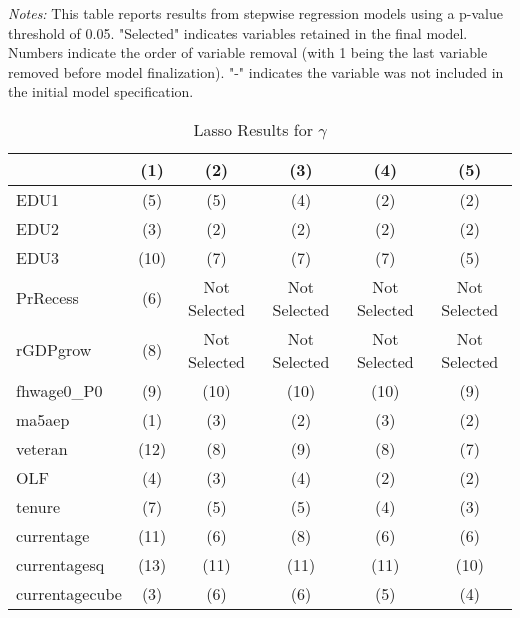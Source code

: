 \documentclass[12pt]{article}
\begin{document}
\begin{table}[ht]
\begin{tabular}{lccccc}
\bottomrule
\end{tabular}%
\newline

\footnotesize
\textit{Notes:} This table reports results from stepwise regression models using a p-value threshold of 0.05. "Selected" indicates variables retained in the final model. Numbers indicate the order of variable removal (with 1 being the last variable removed before model finalization). "-" indicates the variable was not included in the initial model specification.

\end{table}





\begin{table}[ht]
\centering
\caption{Lasso Results for $\gamma$}

\begin{tabular}{lccccc}

\toprule
                    & (1)     & (2)   & (3)    & (4)      & (5)         \\

\midrule
EDU1                &  (5)  &  (5)    &  (4)  &  (2)   &  (2)    \\
EDU2                &  (3)  &  (2)    &  (2)  &  (2)   &  (2)    \\
EDU3                &  (10)  &  (7)    &  (7)  &  (7)   &  (5)    \\
PrRecess            &  (6)   & Not Selected    & Not Selected   & Not Selected    & Not Selected     \\
rGDPgrow            &  (8)   & Not Selected     & Not Selected   & Not Selected    & Not Selected     \\
fhwage0\_P0         &  (9)   &  (10)     &  (10)   &  (10)    &  (9)     \\
ma5aep              &  (1)   &  (3)     &  (2)   &  (3)    &  (2)     \\
veteran             &  (12)   &  (8)     &  (9)   &  (8)    &  (7)     \\
OLF                 &  (4)   &  (3)     &  (4)   &  (2)    &  (2)     \\
tenure              &  (7)   &  (5)     &  (5)   &  (4)    &  (3)     \\
currentage          &  (11)   &  (6)     &  (8)   &  (6)    &  (6)     \\
currentagesq        &  (13)  &  (11)    &  (11)  &  (11)   &  (10)    \\
currentagecube      &  (3)  &  (6)    &  (6)  &  (5)   &  (4)    \\


\end{tabular}
\end{table}
\end{document}
